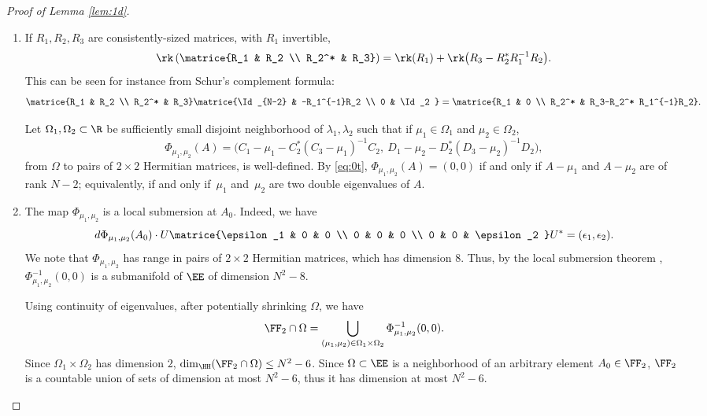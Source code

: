 \begin{proof}[Proof of Lemma \ref{lem:1d}]
\begin{enumerate}
\item
If $R_1, R_2, R_3$ are consistently-sized matrices, with $R_1$ invertible,
\begin{equation*}
\rk \left(\matrice{R_1 & R_2 \\ R_2^* & R_3} \right) = \rk(R_1)+ \rk \bigl(R_3-R_2^* R_1^{-1}R_2\bigr).
\end{equation*}
This can be seen for instance from Schur's complement formula:
\begin{equation}\label{eq:0t}
\matrice{R_1 & R_2 \\ R_2^* & R_3} \matrice{\Id_{N-2} & -R_1^{-1}R_2 \\ 0 & \Id_2 } = \matrice{R_1 & 0 \\ R_2^* & R_3-R_2^* R_1^{-1}R_2}.
\end{equation}

Let $\Omega_1, \Omega_2 \subset \R$ be sufficiently small disjoint neighborhood of $\lambda_1, \lambda_2$ such that if $\mu_1 \in \Omega_1$ and $\mu_2 \in \Omega_2$,
\begin{equation*}
\Phi_{\mu_1,\mu_2}(A) = \bigl( C_1 - \mu_1 - C_2^* (C_3-\mu_1)^{-1} C_2, \ D_1 - \mu_2 - D_2^* (D_3-\mu_2)^{-1} D_2 \bigr),
\end{equation*}
from $\Omega$ to pairs of $2 \times 2$ Hermitian matrices, is well-defined. By \eqref{eq:0t}, $\Phi_{\mu_1,\mu_2}(A) = (0,0)$ if and only if $A-\mu_1$ and $A - \mu_2$ are of rank $N-2$; equivalently, if and only if~$\mu_1$ and~$\mu_2$ are two double eigenvalues of $A$.

\item
The map $\Phi_{\mu_1,\mu_2}$ is a local submersion at $A_0$. Indeed, we have
\begin{equation*}
d\Phi_{\mu_1,\mu_2}(A_0) \cdot U \matrice{\epsilon_1 & 0 & 0 \\ 0 & 0 & 0 \\ 0 & 0 & \epsilon_2 }U^* = (\epsilon_1,\epsilon_2).
\end{equation*}
We note that $\Phi_{\mu_1,\mu_2}$ has range in pairs of $2 \times 2$ Hermitian matrices, which has dimension $8$. Thus, by the local submersion theorem \cite[\S4]{GP74}, $\Phi_{\mu_1,\mu_2}^{-1}(0,0)$ is a submanifold of $\EE$ of dimension $N^2-8$.

Using continuity of eigenvalues, after potentially shrinking $\Omega$, we have
\begin{equation*}
\FF_2 \cap \Omega = \bigcup_{(\mu_1,\mu_2) \in \Omega_1 \times \Omega_2} \Phi_{\mu_1,\mu_2}^{-1}(0,0).
\end{equation*}
Since $\Omega_1 \times \Omega_2$ has dimension $2$, $\dim_\HH(\FF_2 \cap \Omega) \leq N^2-6$. Since $\Omega \subset \EE$ is a neighborhood of an arbitrary element $A_0 \in \FF_2$, $\FF_2$ is a countable union of sets of dimension at most $N^2-6$, thus it has dimension at most $N^2-6$.\qedhere
\end{enumerate}
\end{proof}

